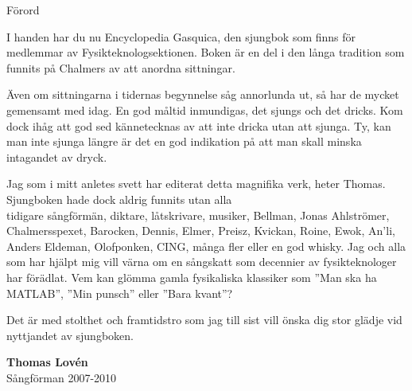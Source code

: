 \begin{flushleft}
{\Huge Förord\\}
\end{flushleft}

{\large
\setlength{\parskip}{0.8em}
I handen har du nu Encyclopedia Gasquica, den sjungbok som finns för medlemmar av Fysikteknologsektionen.
Boken är en del i den långa tradition som funnits på Chalmers av att anordna sittningar.

Även om sittningarna i tidernas begynnelse såg annorlunda ut, så har de mycket gemensamt med idag.
En god måltid inmundigas, det sjungs och det dricks.
Kom dock ihåg att god sed kännetecknas av att inte dricka utan att sjunga.
Ty, kan man inte sjunga längre är det en god indikation på att man skall minska intagandet av dryck.

Jag som i mitt anletes svett har editerat detta magnifika verk, heter Thomas.
Sjungboken hade dock aldrig funnits utan alla \\tidigare sångförmän, diktare, låtskrivare, musiker, Bellman, Jonas Ahlströmer, Chalmersspexet, Barocken,
Dennis, Elmer, Preisz, Kvickan, Roine, Ewok, An'li, Anders Eldeman, Olofponken, CING, många fler eller en god whisky.
Jag och alla som har hjälpt mig vill värna om en sångskatt som decennier av fysikteknologer har förädlat.
Vem kan glömma gamla fysikaliska klassiker som ''Man ska ha MATLAB'', ''Min punsch'' eller ''Bara kvant''?

Det är med stolthet och framtidstro som jag till sist vill önska dig stor glädje vid nyttjandet av sjungboken.

\vspace{0.5cm}
\begin{flushright}
\textbf{Thomas Lovén}\\
Sångförman 2007-2010
\end{flushright}
}

\newpage

